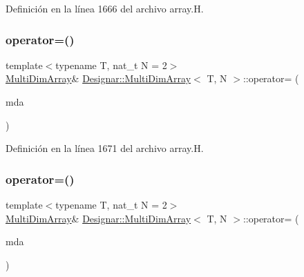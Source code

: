 Definición en la línea 1666 del archivo array.\+H.

\mbox{\label{class_designar_1_1_multi_dim_array_a4f191233c720bc670a181682b0452347}} 
\subsubsection{\texorpdfstring{operator=()}{operator=()}\hspace{0.1cm}{\footnotesize\ttfamily [1/2]}}
{\footnotesize\ttfamily template$<$typename T, nat\+\_\+t N = 2$>$ \\
\hyperlink{class_designar_1_1_multi_dim_array}{Multi\+Dim\+Array}\& \hyperlink{class_designar_1_1_multi_dim_array}{Designar\+::\+Multi\+Dim\+Array}$<$ T, N $>$\+::operator= (\begin{DoxyParamCaption}\item[{const \hyperlink{class_designar_1_1_multi_dim_array}{Multi\+Dim\+Array}$<$ T, N $>$ \&}]{mda }\end{DoxyParamCaption})\hspace{0.3cm}{\ttfamily [inline]}}



Definición en la línea 1671 del archivo array.\+H.

\mbox{\label{class_designar_1_1_multi_dim_array_a45e425f7a1795d97822d8fafe5c02244}} 
\subsubsection{\texorpdfstring{operator=()}{operator=()}\hspace{0.1cm}{\footnotesize\ttfamily [2/2]}}
{\footnotesize\ttfamily template$<$typename T, nat\+\_\+t N = 2$>$ \\
\hyperlink{class_designar_1_1_multi_dim_array}{Multi\+Dim\+Array}\& \hyperlink{class_designar_1_1_multi_dim_array}{Designar\+::\+Multi\+Dim\+Array}$<$ T, N $>$\+::operator= (\begin{DoxyParamCaption}\item[{\hyperlink{class_designar_1_1_multi_dim_array}{Multi\+Dim\+Array}$<$ T, N $>$ \&\&}]{mda }\end{DoxyParamCaption})\hspace{0.3cm}{\ttfamily [inline]}}




